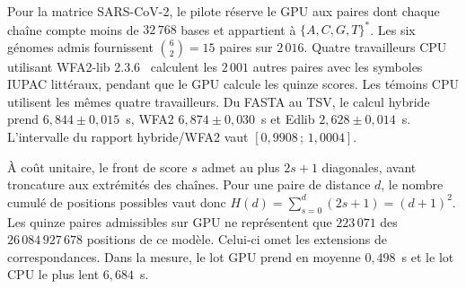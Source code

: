 Pour la matrice SARS-CoV-2, le pilote réserve le GPU aux paires dont chaque chaîne compte moins de \(32\,768\) bases et appartient à \(\{A,C,G,T\}^{*}\). Les six génomes admis fournissent \(\binom{6}{2}=15\) paires sur \(2\,016\). Quatre travailleurs CPU utilisant WFA2-lib 2.3.6~\cite{wfa2code} calculent les \(2\,001\) autres paires avec les symboles IUPAC littéraux, pendant que le GPU calcule les quinze scores. Les témoins CPU utilisent les mêmes quatre travailleurs. Du FASTA au TSV, le calcul hybride prend \(6{,}844\pm0{,}015\)~s, WFA2 \(6{,}874\pm0{,}030\)~s et Edlib \(2{,}628\pm0{,}014\)~s. L’intervalle du rapport hybride/WFA2 vaut \([0{,}9908\,;\,1{,}0004]\).

À coût unitaire, le front de score \(s\) admet au plus \(2s+1\) diagonales, avant troncature aux extrémités des chaînes. Pour une paire de distance \(d\), le nombre cumulé de positions possibles vaut donc \(H(d)=\sum_{s=0}^{d}(2s+1)=(d+1)^2\). Les quinze paires admissibles sur GPU ne représentent que \(223\,071\) des \(26\,084\,927\,678\) positions de ce modèle. Celui-ci omet les extensions de correspondances. Dans la mesure, le lot GPU prend en moyenne \(0{,}498\)~s et le lot CPU le plus lent \(6{,}684\)~s.

